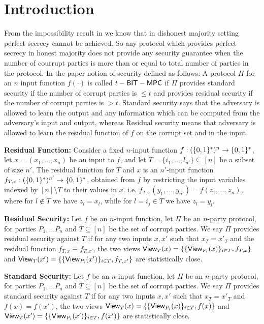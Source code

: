 \section{Introduction}
From the impossibility result in \cite{Cramer98} we know that in dishonest majority setting perfect secrecy cannot be achieved. So any protocol which provides perfect secrecy in honest majority does not provide any security guarantee when the number of courrupt parties is more than or equal to total number of parties in the protocol. In the paper \cite{BITMPC} notion of security defined as follows: A protocol $\Pi$ for an $n$ input function $f(\cdot)$ is called $t-\mathsf{BIT-MPC}$ if $\Pi$ provides standard security if the number of corrupt parties is $\leq t$ and provides residual security if the number of corrupt parties is $> t$. Standard security says that the adversary is allowed to learn the output and any information which can be computed from the adversary's input and output, whereas Residual security means that adversary is allowed to learn the residual function of $f$ on the corrupt set and in the input.

\textbf{Residual Function:} Consider a fixed $n$-input function $f:(\{0,1\}^*)^n\rightarrow\{0,1\}^*$, let $x=(x_1,\ldots,x_n)$ be an input to $f$, and let $T=\{i_1,\ldots,l_{n'}\}\subseteq [n]$ be a subset of size $n'$. The residual function for $T$ and $x$ is an $n'$-input function $f_{T,x}:(\{0,1\}^*)^{n'}\rightarrow \{0,1\}^*$, obtained from $f$ by restricting the input variables indexed by $[n]\setminus T$ to their values in $x$. i.e. $f_{T,x}(y_1,\ldots,y_{n'})=f(z_1,\ldots,z_n)$, where for $l\notin T$ we have $z_l=x_l$, while for $l=i_j \in T$ we have $z_l=y_l$.

\textbf{Residual Security:} Let $f$ be an $n$-input function, let $\Pi$ be an $n$-party protocol, for parties $P_1,\ldots P_n$ and $T\subseteq [n]$ be the set of corrupt parties. We say $\Pi$ provides residual security against $T$ if for any two inputs $x, x'$ such that $x_T=x'_T$ and the residual function $f_{T,x} \equiv f_{T,x'}$, the two views $\mathsf{View}_T(x)=\{\{\mathsf{View}_{P_i}(x)\}_{i\in T}, f_{T,x}\}$ and $\mathsf{View}_T(x')=\{\{\mathsf{View}_{P_i}(x')\}_{i\in T}, f_{T,x'}\}$ are statistically close.

\textbf{Standard Security:} Let $f$ be an $n$-input function, let $\Pi$ be an $n$-party protocol, for parties $P_1,\ldots P_n$ and $T\subseteq [n]$ be the set of corrupt parties. We say $\Pi$ provides standard security against $T$ if for any two inputs $x, x'$ such that $x_T=x'_T$ and $f(x)=f(x')$, the two views $\mathsf{View}_T(x)=\{\{\mathsf{View}_{P_i}(x)\}_{i\in T}, f(x)\}$ and $\mathsf{View}_T(x')=\{\{\mathsf{View}_{P_i}(x')\}_{i\in T}, f(x')\}$ are statistically close.

